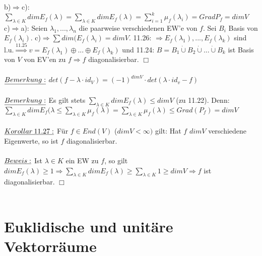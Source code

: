 \documentclass[fleqn, a4paper, 11pt]{article}
\begin{document}
b)$\Rightarrow$c): $\sum\limits_{\lambda\in K} dim E_f(\lambda)=\sum\limits_{\lambda\in K} dim E_f(\lambda)=\sum\limits_{i=1}^k \mu_f(\lambda_i)=Grad P_f=dim V$\\
c)$\Rightarrow$a): Seien $\lambda_1,...,\lambda_n$ die paarweise verschiedenen EW'e von $f$. Sei $B_i$ Basis von $E_f(\lambda_i)$. c)$\Rightarrow\sum dim(E_f(\lambda_i)=dim V$. 11.26: $\Rightarrow E_f(\lambda_1),...,E_f(\lambda_k)$ sind l.u.$\stackrel{11.25}{\Rightarrow} v=E_f(\lambda_1)\oplus...\oplus E_f(\lambda_k)$ und 11.24: $B=B_1\mathbin{\dot{\cup}}B_2\mathbin{\dot{\cup}}...\mathbin{\dot{\cup}}B_k$ ist Basis von $V$ von EV'en zu $f\Rightarrow f$ diagonalisierbar. \hfill $\Box$\\
\\
$\uline{Bemerkung:}$ $det(f-\lambda\cdot id_V)=(-1)^{dim V}\cdot det(\lambda\cdot id_v -f)$\\
\\
$\uline{Bemerkung:}$ Es gilt stets $\sum\limits_{\lambda\in K} dim E_f(\lambda)\leq dim V$ (zu 11.22). Denn: $\sum\limits_{\lambda\in K}dim E_f(\lambda\leq \sum\limits_{\lambda\in K}\mu_f(\lambda)=\sum\limits_{\lambda\in K}\mu_f(\lambda)\leq Grad(P_f)=dim V$\\
\\
$\uline{Korollar\:11.27:}$ F\"ur $f\in End(V)$ ($dim V<\infty)$ gilt: Hat $f$ $dim V$ verschiedene Eigenwerte, so ist $f$ diagonalisierbar.\\
\\
$\uline{Beweis:}$ Ist $\lambda\in K$ ein EW zu $f$, so gilt $dim E_f(\lambda)\geq 1\Rightarrow \sum\limits_{\lambda\in K} dim E_f(\lambda)\geq\sum\limits_{\lambda\in K} 1\geq dim V\Rightarrow f$ ist diagonalisierbar. \hfill $\Box$\\
\\
\newpage
\section{Euklidische und unit\"are Vektorr\"aume}
\end{document}
